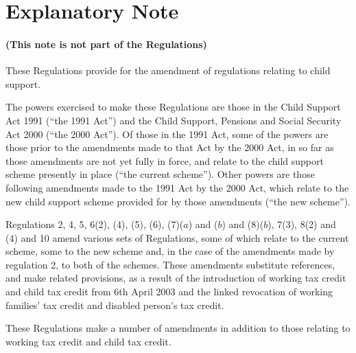 \documentclass[12pt,a4paper]{article}
\begin{document}
\part{Explanatory Note}

\renewcommand\parthead{— Explanatory Note}

\subsection*{(This note is not part of the Regulations)}

These Regulations provide for the amendment of regulations relating to child support.

The powers exercised to make these Regulations are those in the Child Support Act 1991 (“the 1991 Act”) and the Child Support, Pensions and Social Security Act 2000 (“the 2000 Act”). Of those in the 1991 Act, some of the powers are those prior to the amendments made to that Act by the 2000 Act, in so far as those amendments are not yet fully in force, and relate to the child support scheme presently in place (“the current scheme”). Other powers are those following amendments made to the 1991 Act by the 2000 Act, which relate to the new child support scheme provided for by those amendments (“the new scheme”).

Regulations 2, 4, 5, 6(2), (4), (5), (6), (7)($a$)  and ($b$)  and (8)($b$), 7(3), 8(2) and (4) and 10 amend various sets of Regulations, some of which relate to the current scheme, some to the new scheme and, in the case of the amendments made by regulation 2, to both of the schemes. These amendments substitute references, and make related provisions, as a result of the introduction of working tax credit and child tax credit from 6th April 2003 and the linked revocation of working families' tax credit and disabled person’s tax credit.

These Regulations make a number of amendments in addition to those relating to working tax credit and child tax credit.
\end{document}
